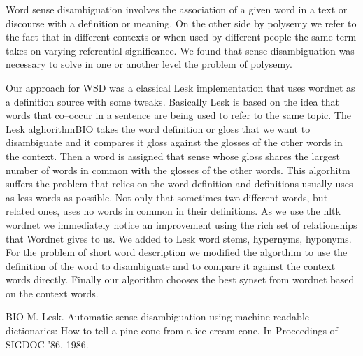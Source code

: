 Word sense disambiguation involves the association of a given word in a text or discourse with a definition or meaning.
On the other side by polysemy we refer to the fact that in different contexts or when used by different people the same term takes on varying referential significance.
We found that sense disambiguation was necessary to solve in one or another level the problem of polysemy.


Our approach for WSD was a classical Lesk implementation that uses wordnet as a definition source with some tweaks.
Basically Lesk is based on the idea that words that co–occur in a sentence are being used to refer to the same topic.
The Lesk alghorithm{BIO} takes the word definition or gloss that we want to disambiguate and it compares it gloss against the glosses of the other words in the context.
Then a word is assigned that sense whose gloss shares the largest number of words in common with the glosses of the other words.
This algorhitm suffers the problem that relies on the word definition and definitions usually uses as less words as possible.
Not only that sometimes two different words, but related ones, uses no words in common in their definitions.
As we use the nltk wordnet we immediately notice an improvement using the rich set of relationships that Wordnet gives to us.
We added to Lesk word stems, hypernyms, hyponyms.
For the problem of short word description we modified the algorthim to use the definition of the word to disambiguate and to compare it against the context words directly.
Finally our algorithm chooses the best synset from wordnet based on the context words.

BIO
M. Lesk. Automatic sense disambiguation using machine readable dictionaries: How to tell a pine cone from a ice cream cone. In Proceedings of SIGDOC ’86, 1986.
